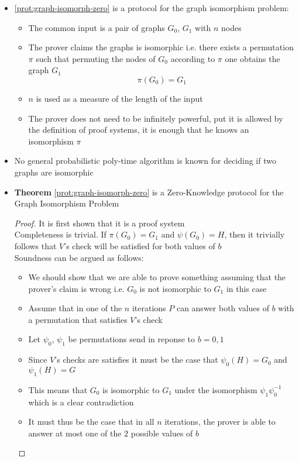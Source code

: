 \begin{itemize}
  \item \autoref{prot:graph-isomorph-zero} is a protocol for the graph isomorphism problem: 
  \begin{itemize}
  	\item The common input is a pair of graphs $G_0$, $G_1$ with $n$ nodes
    \item The prover claims the graphs is isomorphic i.e. there exists a permutation $\pi$ such that permuting the nodes of $G_0$ according to $\pi$ one obtains the graph $G_1$ 
    \[
      \pi(G_0) = G_1
    \]
    \item $n$ is used as a measure of the length of the input
    \item The prover does not need to be infinitely powerful, put it is allowed by the definition of proof systems, it is enough that he knows an isomorphism $\pi$ 
  \end{itemize}
  \item No general probabilistic poly-time algorithm is known for deciding if two graphs are isomorphic
  \item \textbf{Theorem} \autoref{prot:graph-isomorph-zero} is a Zero-Knowledge protocol for the Graph Isomorphism Problem
  \begin{proof} 
    It is first shown that it is a proof system \smallskip \\
    Completeness is trivial. If $\pi(G_0) = G_1$ and $\psi(G_0) = H$, then it trivially follows that $V$'s check will be satisfied for both values of $b$ \\
    Soundness can be argued as follows: 
    \begin{itemize}
    	\item We should show that we are able to prove something assuming that the prover's claim is wrong i.e. $G_0$ is not isomorphic to $G_1$ in this case
      \item Assume that in one of the $n$ iterations $P$ can answer both values of $b$ with a permutation that satisfies $V$'s check
      \item Let $\psi_0$, $\psi_1$ be permutations send in reponse to $b=0,1$ 
      \item Since $V$'s checks are satisfies it must be the case that $\psi_0(H) = G_0$ and $\psi_1(H) = G$
      \item This means that $G_0$ is isomorphic to $G_1$ under the isomorphism $\psi_1 \psi_0^{-1}$ which is a clear contradiction
      \item It must thus be the case that in all $n$ iterations, the prover is able to answer at most one of the $2$ possible values of $b$

\end{itemize}
\end{proof}
\end{itemize}
